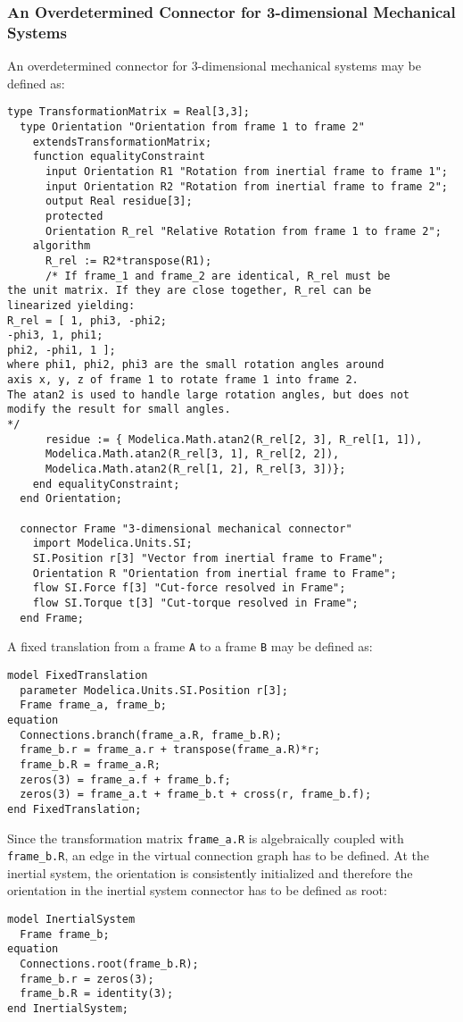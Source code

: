 \subsubsection{An Overdetermined Connector for 3-dimensional Mechanical Systems}

\begin{nonnormative}
An overdetermined connector for 3-dimensional mechanical systems
may be defined as:
\begin{lstlisting}[language=modelica]
  type TransformationMatrix = Real[3,3];
  type Orientation "Orientation from frame 1 to frame 2"
    extendsTransformationMatrix;
    function equalityConstraint
      input Orientation R1 "Rotation from inertial frame to frame 1";
      input Orientation R2 "Rotation from inertial frame to frame 2";
      output Real residue[3];
      protected
      Orientation R_rel "Relative Rotation from frame 1 to frame 2";
    algorithm
      R_rel := R2*transpose(R1);
      /* If frame_1 and frame_2 are identical, R_rel must be
the unit matrix. If they are close together, R_rel can be
linearized yielding:
R_rel = [ 1, phi3, -phi2;
-phi3, 1, phi1;
phi2, -phi1, 1 ];
where phi1, phi2, phi3 are the small rotation angles around
axis x, y, z of frame 1 to rotate frame 1 into frame 2.
The atan2 is used to handle large rotation angles, but does not
modify the result for small angles.
*/
      residue := { Modelica.Math.atan2(R_rel[2, 3], R_rel[1, 1]),
      Modelica.Math.atan2(R_rel[3, 1], R_rel[2, 2]),
      Modelica.Math.atan2(R_rel[1, 2], R_rel[3, 3])};
    end equalityConstraint;
  end Orientation;

  connector Frame "3-dimensional mechanical connector"
    import Modelica.Units.SI;
    SI.Position r[3] "Vector from inertial frame to Frame";
    Orientation R "Orientation from inertial frame to Frame";
    flow SI.Force f[3] "Cut-force resolved in Frame";
    flow SI.Torque t[3] "Cut-torque resolved in Frame";
  end Frame;
\end{lstlisting}
A fixed translation from a frame \lstinline!A! to a frame \lstinline!B! may be defined as:
\begin{lstlisting}[language=modelica]
model FixedTranslation
  parameter Modelica.Units.SI.Position r[3];
  Frame frame_a, frame_b;
equation
  Connections.branch(frame_a.R, frame_b.R);
  frame_b.r = frame_a.r + transpose(frame_a.R)*r;
  frame_b.R = frame_a.R;
  zeros(3) = frame_a.f + frame_b.f;
  zeros(3) = frame_a.t + frame_b.t + cross(r, frame_b.f);
end FixedTranslation;
\end{lstlisting}
Since the transformation matrix \lstinline!frame_a.R! is algebraically
coupled with \lstinline!frame_b.R!, an edge in the virtual connection graph
has to be defined. At the inertial system, the orientation is
consistently initialized and therefore the orientation in the inertial
system connector has to be defined as root:
\begin{lstlisting}[language=modelica]
model InertialSystem
  Frame frame_b;
equation
  Connections.root(frame_b.R);
  frame_b.r = zeros(3);
  frame_b.R = identity(3);
end InertialSystem;
\end{lstlisting}
\end{nonnormative}
